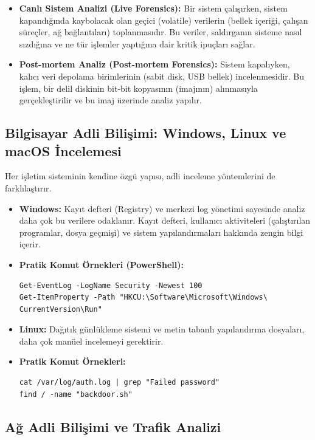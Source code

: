\begin{itemize}
\begin{itemize}
    \item \textbf{Canlı Sistem Analizi (Live Forensics):} Bir sistem çalışırken, sistem kapandığında kaybolacak olan geçici (volatile) verilerin (bellek içeriği, çalışan süreçler, ağ bağlantıları) toplanmasıdır. Bu veriler, saldırganın sisteme nasıl sızdığına ve ne tür işlemler yaptığına dair kritik ipuçları sağlar.
    \item \textbf{Post-mortem Analiz (Post-mortem Forensics):} Sistem kapalıyken, kalıcı veri depolama birimlerinin (sabit disk, USB bellek) incelenmesidir. Bu işlem, bir delil diskinin bit-bit kopyasının (imajının) alınmasıyla gerçekleştirilir ve bu imaj üzerinde analiz yapılır.
\end{itemize}

\subsection{Bilgisayar Adli Bilişimi: Windows, Linux ve macOS İncelemesi}

Her işletim sisteminin kendine özgü yapısı, adli inceleme yöntemlerini de farklılaştırır.

\begin{itemize}
    \item \textbf{Windows:} Kayıt defteri (Registry) ve merkezi log yönetimi sayesinde analiz daha çok bu verilere odaklanır. Kayıt defteri, kullanıcı aktiviteleri (çalıştırılan programlar, dosya geçmişi) ve sistem yapılandırmaları hakkında zengin bilgi içerir.
    \item \textbf{Pratik Komut Örnekleri (PowerShell):}
    \begin{verbatim}
Get-EventLog -LogName Security -Newest 100
Get-ItemProperty -Path "HKCU:\Software\Microsoft\Windows\
CurrentVersion\Run"
    \end{verbatim}
    \item \textbf{Linux:} Dağıtık günlükleme sistemi ve metin tabanlı yapılandırma dosyaları, daha çok manüel incelemeyi gerektirir.
    \item \textbf{Pratik Komut Örnekleri:}
    \begin{verbatim}
cat /var/log/auth.log | grep "Failed password"
find / -name "backdoor.sh"
    \end{verbatim}
\end{itemize}

\subsection{Ağ Adli Bilişimi ve Trafik Analizi}


\end{itemize}
